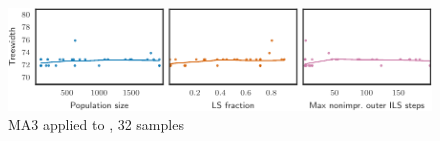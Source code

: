 \begin{figure}[h]\strictpagecheck\centering

\includegraphics[scale=0.85]{plots/MA3-correlation-regplots-queen10-10-0-crop.pdf}


\caption[Parameter influence for MA3 when applied to ]{\gls{MA3} applied to , 32 samples}

\label{MA3-correlation-regplots-queen10-10}

\end{figure}